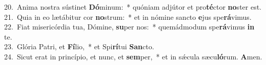 {20.~}Anima nostra sústinet \textbf{Dó}minum:~* quóniam adjútor et pro\textbf{té}ctor \textbf{no}ster est.\\
{21.~}Quia in eo lætábitur cor \textbf{no}strum:~* et in nómine sancto \textbf{e}jus spe\textbf{rá}vimus.\\
{22.~}Fiat misericórdia tua, Dómine, \textbf{su}per nos:~* quemádmodum spe\textbf{rá}vimus \textbf{in} te.\\
{23.~}Glória Patri, et \textbf{Fí}lio,~* et Spi\textbf{rí}tui \textbf{San}cto.\\
{24.~}Sicut erat in princípio, et nunc, et \textbf{sem}per,~* et in sǽcula sæcu\textbf{ló}rum. \textbf{A}men.\\
